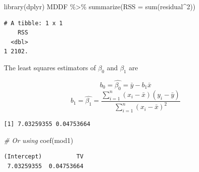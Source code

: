 \documentclass[
]{article}
\newenvironment{Shaded}{\begin{snugshade}}{\end{snugshade}}
\newcommand{\AttributeTok}[1]{\textcolor[rgb]{0.77,0.63,0.00}{#1}}
\newcommand{\CommentTok}[1]{\textcolor[rgb]{0.56,0.35,0.01}{\textit{#1}}}
\newcommand{\DecValTok}[1]{\textcolor[rgb]{0.00,0.00,0.81}{#1}}
\newcommand{\FunctionTok}[1]{\textcolor[rgb]{0.00,0.00,0.00}{#1}}
\newcommand{\NormalTok}[1]{#1}
\newcommand{\OtherTok}[1]{\textcolor[rgb]{0.56,0.35,0.01}{#1}}
\newcommand{\SpecialCharTok}[1]{\textcolor[rgb]{0.00,0.00,0.00}{#1}}
\begin{document}
\begin{Shaded}
\begin{Highlighting}[]
\FunctionTok{library}\NormalTok{(dplyr)}
\NormalTok{MDDF }\SpecialCharTok{\%\textgreater{}\%} 
  \FunctionTok{summarize}\NormalTok{(}\AttributeTok{RSS =} \FunctionTok{sum}\NormalTok{(residual}\SpecialCharTok{\^{}}\DecValTok{2}\NormalTok{))}
\end{Highlighting}
\end{Shaded}

\begin{verbatim}
# A tibble: 1 x 1
    RSS
  <dbl>
1 2102.
\end{verbatim}

The least squares estimators of \(\beta_0\) and \(\beta_1\) are

\[b_0 = \hat{\beta_0} = \bar{y} - b_1\bar{x}\]
\[b_1 = \hat{\beta_1} = \frac{\sum_{i = 1}^n(x_i - \bar{x})(y_i - \bar{y})}{\sum_{i=1}^n(x_i-\bar{x})^2}\]

\begin{Shaded}
\end{Shaded}

\begin{verbatim}
[1] 7.03259355 0.04753664
\end{verbatim}

\begin{Shaded}
\begin{Highlighting}[]
\CommentTok{\# Or using}
\FunctionTok{coef}\NormalTok{(mod1)}
\end{Highlighting}
\end{Shaded}

\begin{verbatim}
(Intercept)          TV 
 7.03259355  0.04753664 
\end{verbatim}
\end{document}
